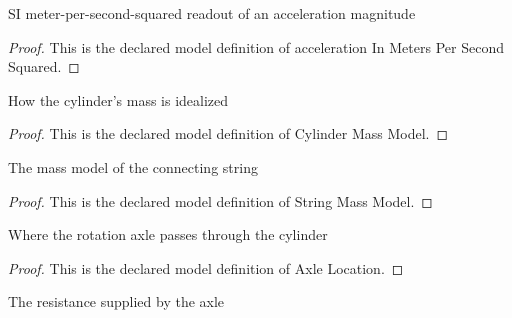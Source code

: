 \begin{definition}
  \label{def:physics:phyx-mini-0706:phyxminiproblems-problemphyxmini0706-accelerationinmeterspersecondsquared}
  SI meter-per-second-squared readout of an acceleration magnitude
\end{definition}
\begin{proof}
  This is the declared model definition of acceleration In Meters Per Second Squared.
\end{proof}
\begin{definition}
  \label{def:physics:phyx-mini-0706:phyxminiproblems-problemphyxmini0706-cylindermassmodel}
  How the cylinder's mass is idealized
\end{definition}
\begin{proof}
  This is the declared model definition of Cylinder Mass Model.
\end{proof}
\begin{definition}
  \label{def:physics:phyx-mini-0706:phyxminiproblems-problemphyxmini0706-stringmassmodel}
  The mass model of the connecting string
\end{definition}
\begin{proof}
  This is the declared model definition of String Mass Model.
\end{proof}
\begin{definition}
  \label{def:physics:phyx-mini-0706:phyxminiproblems-problemphyxmini0706-axlelocation}
  Where the rotation axle passes through the cylinder
\end{definition}
\begin{proof}
  This is the declared model definition of Axle Location.
\end{proof}
\begin{definition}
  \label{def:physics:phyx-mini-0706:phyxminiproblems-problemphyxmini0706-axleresistancemodel}
  The resistance supplied by the axle
\end{definition}
